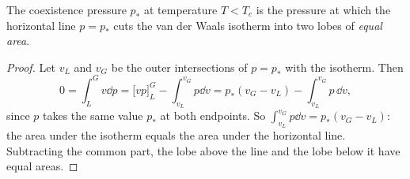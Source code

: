 \begin{proposition}
	The coexistence pressure $p_*$ at temperature $T < T_c$ is the pressure at which the horizontal line $p = p_*$ cuts the van der Waals isotherm into two lobes of \emph{equal area}.
\end{proposition}
\begin{proof}
	Let $v_L$ and $v_G$ be the outer intersections of $p = p_*$ with the isotherm. Then
	$$
	0 = \int_L^G v\dd p = \big[vp\big]_L^G - \int_{v_L}^{v_G}p\dd v = p_*(v_G - v_L) - \int_{v_L}^{v_G}p\,\dd v,
	$$
	since $p$ takes the same value $p_*$ at both endpoints. So $\int_{v_L}^{v_G}p\dd v = p_*(v_G-v_L)$: the area under the isotherm equals the area under the horizontal line. Subtracting the common part, the lobe above the line and the lobe below it have equal areas.
\end{proof}

